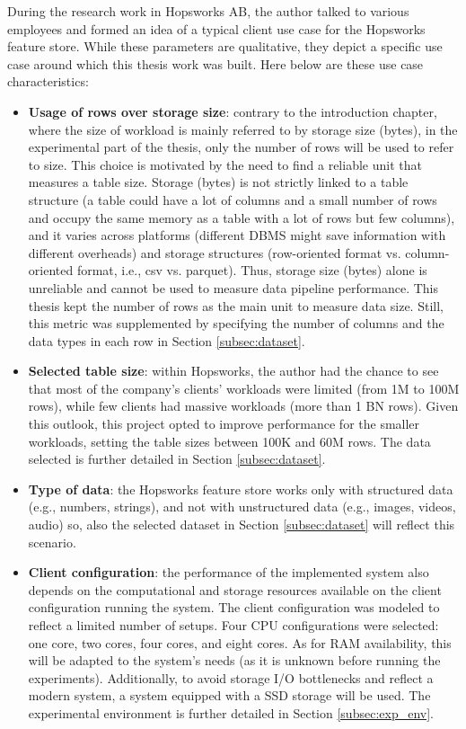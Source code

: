 During the research work in Hopsworks \gls{AB}, the author talked to various employees and formed an idea of a typical client use case for the Hopsworks feature store. While these parameters are qualitative, they depict a specific use case around which this thesis work was built. Here below are these use case characteristics:
\begin{itemize}
  \item \textbf{Usage of rows over storage size}: contrary to the introduction chapter, where the size of workload is mainly referred to by storage size (bytes), in the experimental part of the thesis, only the number of rows will be used to refer to size. This choice is motivated by the need to find a reliable unit that measures a table size. Storage (bytes) is not strictly linked to a table structure (a table could have a lot of columns and a small number of rows and occupy the same memory as a table with a lot of rows but few columns), and it varies across platforms (different \gls{DBMS} might save information with different overheads) and storage structures (row-oriented format vs. column-oriented format, i.e., csv vs. parquet). Thus, storage size (bytes) alone is unreliable and cannot be used to measure data pipeline performance. This thesis kept the number of rows as the main unit to measure data size. Still, this metric was supplemented by specifying the number of columns and the data types in each row in Section \ref{subsec:dataset}.
  \item \textbf{Selected table size}: within Hopsworks, the author had the chance to see that most of the company's clients' workloads were limited (from 1M to 100M rows), while few clients had massive workloads (more than 1 BN rows). Given this outlook, this project opted to improve performance for the smaller workloads, setting the table sizes between 100K and 60M rows. The data selected is further detailed in Section \ref{subsec:dataset}.
  \item \textbf{Type of data}: the Hopsworks feature store works only with structured data (e.g., numbers, strings), and not with unstructured data (e.g., images, videos, audio) so, also the selected dataset in Section \ref{subsec:dataset} will reflect this scenario.
  \item \textbf{Client configuration}: the performance of the implemented system also depends on the computational and storage resources available on the client configuration running the system. The client configuration
  was modeled to reflect a limited number of setups. Four \gls{CPU} configurations were selected: one core, two cores, four cores, and eight cores. As for \gls{RAM} availability, this will be adapted to the system's needs (as it is unknown before running the experiments). Additionally, to avoid storage I/O bottlenecks and reflect a modern system, a system equipped with a \gls{SSD} storage will be used. The experimental environment is further detailed in Section \ref{subsec:exp_env}.
\end{itemize}

